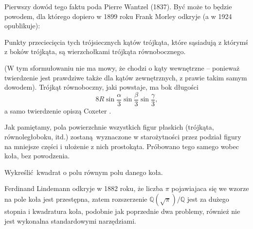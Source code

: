 Pierwszy dowód tego faktu poda Pierre Wantzel (1837).
Być może to będzie powodem, dla którego dopiero w 1899 roku Frank Morley odkryje (a w 1924 opublikuje):

\begin{theorem}[Morleya]
    Punkty przeciecięcia tych trójsiecznych kątów trójkąta, które sąsiadują z którymś z boków trójkąta, są wierzchołkami trójkąta równobocznego.
\end{theorem}

(W tym sformułowaniu nie ma mowy, że chodzi o kąty wewnętrzne -- ponieważ twierdzenie jest prawdziwe także dla kątów zewnętrznych, z prawie takim samym dowodem).
Trójkąt równoboczny, jaki powstaje, ma bok długości
\begin{equation}
    8 R \sin \frac \alpha 3 \sin \frac \beta 3 \sin \frac \gamma 3,
\end{equation}
a samo twierdzenie opiszą Coxeter \cite[s. 39-41]{coxeter_1967}.

Jak pamiętamy, pola powierzchnie wszystkich figur płaskich (trójkąta, równoległoboku, itd.) zostaną wyznaczone w starożytności przez podział figury na mniejsze części i ułożenie z nich prostokąta.
Próbowano tego samego wobec koła, bez powodzenia.

\begin{problem}
%
    Wykreślić kwadrat o polu równym polu danego koła.
\end{problem}

Ferdinand Lindemann odkryje w 1882 roku, że liczba $\pi$ pojawiajaca się we wzorze na pole koła jest przestępna, zatem rozszerzenie $\mathbb Q(\sqrt{\pi}) / \mathbb Q$ jest za dużego stopnia i kwadratura koła, podobnie jak poprzednie dwa problemy, również nie jest wykonalna standardowymi narzędziami.


